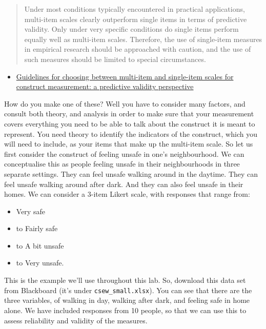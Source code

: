 \documentclass[
]{book}
\providecommand{\tightlist}{%
  \setlength{\itemsep}{0pt}\setlength{\parskip}{0pt}}
\begin{document}
\begin{quote}
Under most conditions typically encountered in practical applications, multi-item scales clearly outperform single items in terms of predictive validity. Only under very specific conditions do single items perform equally well as multi-item scales. Therefore, the use of single-item measures in empirical research should be approached with caution, and the use of such measures should be limited to special circumstances.
\end{quote}

\begin{itemize}
\tightlist
\item
  \href{https://link.springer.com/article/10.1007/s11747-011-0300-3}{Guidelines for choosing between multi-item and single-item scales for construct measurement: a predictive validity perspective}
\end{itemize}

How do you make one of these? Well you have to consider many factors, and consult both theory, and analysis in order to make sure that your measurement covers everything you need to be able to talk about the construct it is meant to represent. You need theory to identify the indicators of the construct, which you will need to include, as your items that make up the multi-item scale. So let us first consider the construct of feeling unsafe in one's neighbourhood. We can conceptualise this as people feeling unsafe in their neighbourhoods in three separate settings. They can feel unsafe walking around in the daytime. They can feel unsafe walking around after dark. And they can also feel unsafe in their homes. We can consider a 3-item Likert scale, with responses that range from:

\begin{itemize}
\tightlist
\item
  Very safe
\item
  to Fairly safe
\item
  to A bit unsafe
\item
  to Very unsafe.
\end{itemize}

This is the example we'll use throughout this lab. So, download this data set from Blackboard (it's under \texttt{csew\_small.xlsx}). You can see that there are the three variables, of walking in day, walking after dark, and feeling safe in home alone. We have included responses from 10 people, so that we can use this to assess reliability and validity of the measures.
\end{document}
